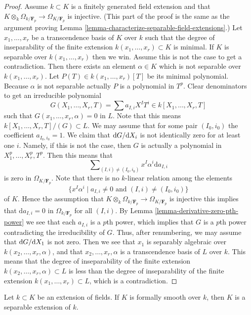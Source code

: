 \begin{proof}
\medskip\noindent
Assume $k \subset K$ is a finitely generated field extension
and that
$K \otimes_k \Omega_{k/\mathbf{F}_p} \to \Omega_{K/\mathbf{F}_p}$
is injective.
(This part of the proof is the same as the argument proving
Lemma \ref{lemma-characterize-separable-field-extensions}.)
Let $x_1, \ldots, x_r$ be a transcendence basis of $K$ over $k$ such
that the degree of inseparability of the finite extension
$k(x_1, \ldots, x_r) \subset K$ is minimal.
If $K$ is separable over $k(x_1, \ldots, x_r)$ then we win.
Assume this is not the case to get a contradiction.
Then there exists an element $\alpha \in K$ which is not
separable over $k(x_1, \ldots, x_r)$. Let $P(T) \in k(x_1, \ldots, x_r)[T]$
be its minimal polynomial. Because $\alpha$ is not separable
actually $P$ is a polynomial in $T^p$. Clear denominators
to get an irreducible polynomial
$$
G(X_1, \ldots, X_r, T) = \sum a_{I, i} X^I T^i \in k[X_1, \ldots, X_r, T]
$$
such that $G(x_1, \ldots, x_r, \alpha) = 0$ in $L$.
Note that this means $k[X_1, \ldots, X_r, T]/(G) \subset L$.
We may assume that for some pair $(I_0, i_0)$ the coefficient
$a_{I_0, i_0} = 1$.
We claim that ${\rm d}G/{\rm d}X_i$ is not identically zero
for at least one $i$. Namely, if this is not the case, then
$G$ is actually a polynomial in $X_1^p, \ldots, X_r^p, T^p$.
Then this means that
$$
\sum\nolimits_{(I, i) \not = (I_0, i_0)} x^I\alpha^i \text{d}a_{I, i}
$$
is zero in $\Omega_{K/\mathbf{F}_p}$. Note that there is no
$k$-linear relation among the elements
$$
\{x^I\alpha^i \mid a_{I, i} \not = 0 \text{ and } (I, i) \not = (I_0, i_0)\}
$$
of $K$. Hence the assumption
that $K \otimes_k \Omega_{k/\mathbf{F}_p} \to \Omega_{K/\mathbf{F}_p}$
is injective this implies that $\text{d}a_{I, i} = 0$
in $\Omega_{k/\mathbf{F}_p}$ for all $(I, i)$.
By Lemma \ref{lemma-derivative-zero-pth-power}
we see that each $a_{I, i}$ is a $p$th power, which
implies that $G$ is a $p$th power contradicting the irreducibility of
$G$. Thus,
after renumbering, we may assume that ${\rm d}G/{\rm d}X_1$ is not zero.
Then we see that $x_1$ is separably algebraic over
$k(x_2, \ldots, x_r, \alpha)$, and that $x_2, \ldots, x_r, \alpha$
is a transcendence basis of $L$ over $k$. This means that
the degree of inseparability of the finite extension
$k(x_2, \ldots, x_r, \alpha) \subset L$ is less than the
degree of inseparability of the finite extension
$k(x_1, \ldots, x_r) \subset L$, which is a contradiction.
\end{proof}

\begin{lemma}
\label{lemma-formally-smooth-implies-separable}
Let $k \subset K$ be an extension of fields.
If $K$ is formally smooth over $k$, then $K$ is
a separable extension of $k$.
\end{lemma}


